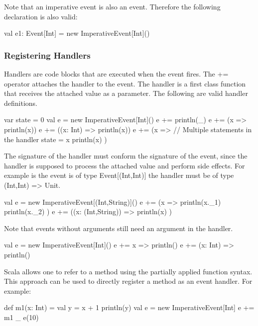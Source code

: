 \documentclass[10pt,a4paper]{article}
\newcommand{\code}[1]{{\fontfamily{cmtt}\small\selectfont#1}}
\begin{document}
Note that an imperative event is also an event. Therefore the
following declaration is also valid:

\begin{codenv}
val e1: Event[Int] = new ImperativeEvent[Int]()
\end{codenv}



\subsubsection{Registering Handlers}

Handlers are code blocks that are executed when the event fires. The
\code{+=} operator attaches the handler to the event. The handler is a
first class function that receives the attached value as a parameter.
The following are valid handler definitions.

\begin{codenv}
var state = 0
val e = new ImperativeEvent[Int]()
e += { println(_) }
e += (x => println(x))
e += ((x: Int) => println(x))
e += (x => {  // Multiple statements in the handler
  state = x
  println(x)
})
\end{codenv}

The signature of the handler must conform the signature of the event,
since the handler is supposed to process the attached value and
perform side effects. For example is the event is of type
\code{Event[(Int,Int)]} the handler must be of type \code{(Int,Int) =>
  Unit}.

\begin{codenv}
val e = new ImperativeEvent[(Int,String)]()
e += (x => {
  println(x._1)
  println(x._2)
})
e += ((x: (Int,String)) => {
  println(x)
})
\end{codenv}

Note that events without arguments still need an argument
in the handler.

\begin{codenv}
val e = new ImperativeEvent[Int]()
e += { x => println() }
e += { (x: Int) => println() }
\end{codenv}

Scala allows one to refer to a method using the partially applied
function syntax. This approach can be used to directly register a
method as an event handler. For example:

\begin{codenv}
def m1(x: Int) = {
  val y = x + 1
  println(y)
}
val e = new ImperativeEvent[Int]
e += m1 _
e(10)
\end{codenv}
\end{document}

